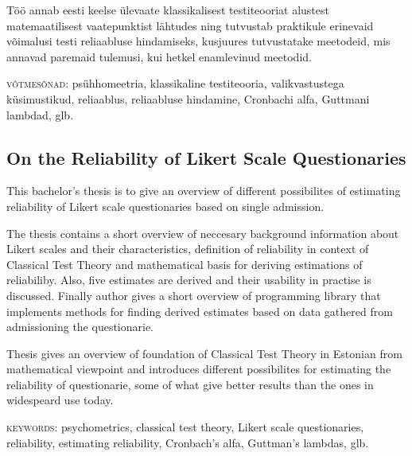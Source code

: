 \documentclass[a4paper,12pt,oneside]{article}
\newcommand{\nocontentsline}[3]{}
\newcommand{\tocless}[2]{\bgroup\let\addcontentsline=\nocontentsline#1{#2}\egroup}
\numberwithin{equation}{section}
\theoremstyle{definition}
\begin{document}
Töö annab eesti keelse ülevaate klassikalisest testiteooriat alustest matemaatilisest vaatepunktist lähtudes ning tutvustab praktikule erinevaid võimalusi testi reliaabluse hindamiseks, kusjuures tutvustatake meetodeid, mis annavad paremaid tulemusi, kui hetkel enamlevinud meetodid. 


\textsc{võtmesõnad:} psühhomeetria, klassikaline testiteooria,  valikvastustega küsimustikud, reliaablus, reliaabluse hindamine,  Cronbachi alfa, Guttmani lambdad, glb. 

\pagebreak

\makeatletter
\tocless{\subsection*{On the Reliability of Likert Scale Questionaries}}

\tocless{\subsubsection*{\@author}}

\tocless{\subsubsection*{Abstract}}



\makeatother

This bachelor's thesis is to give an overview of different possibilites of estimating reliability of Likert scale questionaries based on single admission.

The thesis contains a short overview of neccesary background information about Likert scales and their characteristics, definition of reliability in context of Classical Test Theory and mathematical basis for deriving  estimations of reliabiliby. Also, five estimates are derived and their usability in practise is discussed. Finally author gives a short overview of programming library that implements methods for finding derived estimates based on data gathered from admissioning the questionarie.

Thesis gives an overview of foundation of Classical Test Theory in Estonian from mathematical viewpoint and introduces different possibilites for estimating the reliability of questionarie, some of what give better results than the ones in widespeard use today.

\textsc{keywords:}  psychometrics, classical test theory, Likert scale questionaries, reliability, estimating reliability, Cronbach's alfa, Guttman's lambdas, glb.
\end{document}

